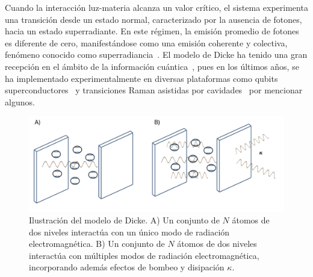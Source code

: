 \documentclass[onecolumn,notitlepage,letterpaper,aps,pra,12pt]{article}
\numberwithin{equation}{section}
\begin{document}
Cuando la interacción luz-materia alcanza un valor crítico, el sistema experimenta una transición desde un estado normal, caracterizado por la ausencia de fotones, hacia un estado superradiante. %
En este régimen, la emisión promedio de fotones es diferente de cero, manifestándose como una emisión coherente y colectiva, fenómeno conocido como superradiancia~\cite{gross1982}. El modelo de Dicke ha tenido una gran recepción en el ámbito de la información cuántica~\cite{Garraway2011,Kirton2018,LeBoite2020}, pues en los últimos años, se ha implementado experimentalmente en diversas plataformas como qubits superconductores~\cite{Blais04,Casanova10} y transiciones Raman asistidas por cavidades~\cite{Baden14,Nagy10} por mencionar algunos. 
\begin{figure}[H]
    \centering
    \includegraphics[width=0.9
\linewidth]{Images/cavity1.png}
    \caption{Ilustración del modelo de Dicke. 
A) Un conjunto de \( N \) átomos de dos niveles interactúa con un único modo de radiación electromagnética. 
B) Un conjunto de \( N \) átomos de dos niveles interactúa con múltiples modos de radiación electromagnética, incorporando además efectos de bombeo y disipación \( \kappa \).}
    \label{Figure Cavity}
\end{figure}
\end{document}
